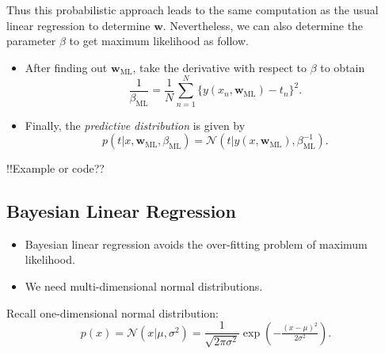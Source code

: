 \documentclass[
]{article}
\begin{document}
Thus this probabilistic approach leads to the same computation as the
usual linear regression to determine \({\boldsymbol{w}}\). Nevertheless,
we can also determine the parameter \(\beta\) to get maximum likelihood
as follow.

\begin{itemize}
\item
  After finding out \({\boldsymbol{w}}_{\mathrm{ML}}\), take the
  derivative with respect to \(\beta\) to obtain
  \[ \frac 1 {\beta_{\mathrm{ML}}} = \frac 1 N \sum_{n=1}^N \{ y(x_n, {\boldsymbol{w}}_{\mathrm{ML}})-t_n \}^2 .\]
\item
  Finally, the \emph{predictive distribution} is given by
  \[ \boxed{ p(t|x, {\boldsymbol{w}}_{\mathrm{ML}}, \beta_{\mathrm{ML}}) = \mathcal N(t|y(x, {\boldsymbol{w}}_{\mathrm{ML}}), \beta_{\mathrm{ML}}^{-1})} .\]
\end{itemize}

!!Example or code??

\hypertarget{bayesian-linear-regression}{%
\subsection{Bayesian Linear
Regression}\label{bayesian-linear-regression}}

\begin{itemize}
\item
  Bayesian linear regression avoids the over-fitting problem of maximum
  likelihood.
\item
  We need multi-dimensional normal distributions.
\end{itemize}

Recall one-dimensional normal distribution:
\[ p(x) =  \mathcal N(x| \mu, \sigma^2)= \frac 1 {\sqrt{2 \pi \sigma^2}} \exp \left ( -\tfrac{(x-\mu)^2}{2 \sigma^2} \right ). \]
\end{document}

